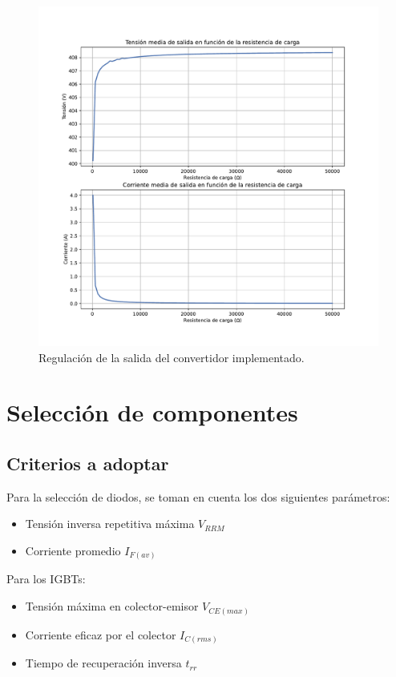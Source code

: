 \begin{figure}
	\centering
	\includegraphics[width=1\linewidth]{img/salida_regulacion}
	\caption{Regulación de la salida del convertidor implementado.}
	\label{fig:salidaregulacion}
\end{figure}



\clearpage

\section{Selección de componentes}

\subsection{Criterios a adoptar}

Para la selección de diodos, se toman en cuenta los dos siguientes parámetros:

\begin{itemize}
	\item Tensión inversa repetitiva máxima $V_{RRM}$
	\item Corriente promedio $I_{F(av)}$
\end{itemize}

Para los IGBTs:

\begin{itemize}
	\item Tensión máxima en colector-emisor $V_{CE(max)}$
	\item Corriente eficaz por el colector $I_{C(rms)}$
	\item Tiempo de recuperación inversa $t_{rr}$
\end{itemize}

